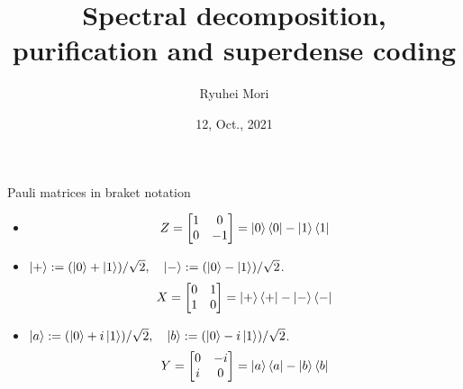 \documentclass[10pt]{beamer}
\title{Spectral decomposition, purification and superdense coding}
\author{Ryuhei Mori}
\institute{Tokyo Institute of Technology}
\date{12, Oct., 2021}
\begin{document}
\begin{frame}[plain]
\maketitle
\end{frame}

\begin{frame}{Pauli matrices in braket notation}
\begin{itemize}
\setlength{\itemsep}{3em}
\item
\begin{equation*}
Z=\begin{bmatrix}1&0\\0&-1\end{bmatrix}=
\ket{0}\bra{0}
-\ket{1}\bra{1}
\end{equation*}
\item
$\ket{+}:=(\ket{0}+\ket{1})/\sqrt{2},\quad  \ket{-}:=(\ket{0}-\ket{1})/\sqrt{2}$.
\begin{equation*}
X=\begin{bmatrix}0&1\\1&0\end{bmatrix}=
\ket{+}\bra{+}
-\ket{-}\bra{-}
\end{equation*}
\item
$\ket{a}:=(\ket{0}+i\ket{1})/\sqrt{2},\quad  \ket{b}:=(\ket{0}-i\ket{1})/\sqrt{2}$.
\begin{equation*}
Y=\begin{bmatrix}0&-i\\i&0\end{bmatrix}=
\ket{a}\bra{a}
-\ket{b}\bra{b}
\end{equation*}
\end{itemize}
\end{frame}
\end{document}
